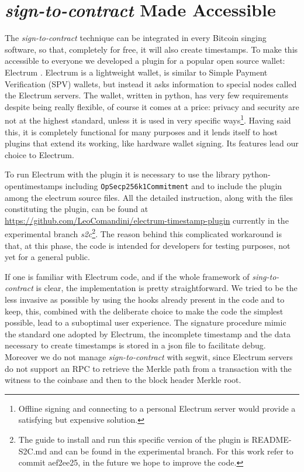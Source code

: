 \section{\textit{sign-to-contract} Made Accessible}
The \textit{sign-to-contract} technique can be integrated in every Bitcoin singing software, so that, completely for free, it will also create timestamps.
To make this accessible to everyone we developed a plugin for a popular open source wallet: Electrum \cite{ElectrumWeb, ElectrumGithub}. 
Electrum is a lightweight wallet, is similar to Simple Payment Verification (SPV) wallets, but instead it asks information to special nodes called the Electrum servers. The wallet, written in python, has very few requirements despite being really flexible, of course it comes at a price: privacy and security are not at the highest standard, unless it is used in very specific ways\footnote{Offline signing and connecting to a personal Electrum server would provide a satisfying but expensive solution.}.
Having said this, it is completely functional for many purposes and it lends itself to host plugins that extend its working, like hardware wallet signing. 
Its features lead our choice to Electrum.

To run Electrum with the plugin it is necessary to use the library python-opentimestamps including \verb|OpSecp256k1Commitment| and to include the plugin among the electrum source files. All the detailed instruction, along with the files constituting the plugin, can be found at \url{https://github.com/LeoComandini/electrum-timestamp-plugin} currently in the experimental branch \textit{s2c}\footnote{The guide to install and run this specific version of the plugin is README-S2C.md and can be found in the experimental branch. For this work refer to commit aef2ee25, in the future we hope to improve the code.}. The reason behind this complicated workaround is that, at this phase, the code is intended for developers for testing purposes, not yet for a general public.

If one is familiar with Electrum code, and if the whole framework of \textit{sing-to-contract} is clear, the implementation is pretty straightforward.  We tried to be the less invasive as possible by using the hooks already present in the code and to keep, this, combined with the deliberate choice to make the code the simplest possible, lead to a suboptimal user experience. 
The signature procedure mimic the standard one adopted by Electrum, the incomplete timestamp and the data necessary to create timestamps is stored in a json file to facilitate debug.
Moreover we do not manage \textit{sign-to-contract} with segwit, since Electrum servers do not support an RPC to retrieve the Merkle path from a transaction with the witness to the coinbase and then to the block header Merkle root.

